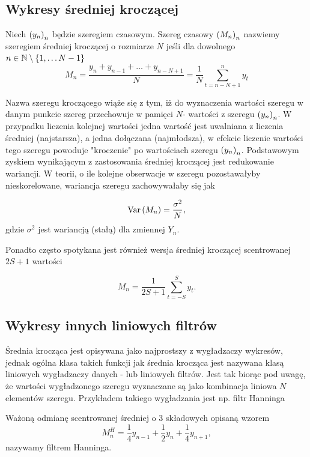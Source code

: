 \documentclass[10pt,a4paper]{book}
\begin{document}
\subsection{Wykresy średniej kroczącej}

\begin{definition}
Niech $\left( {y_n} \right)_{n}^{} $ będzie szeregiem czasowym. Szereg czasowy $\left( {M_n} \right)_{n}^{}$ nazwiemy szeregiem średniej kroczącej o rozmiarze $N$ jeśli dla dowolnego $n \in \mathbb{N} \setminus \left\lbrace {1,\ldots N-1} \right\rbrace $
$$
M_n = \frac{y_n + y_{n-1} + \ldots + y_{n-N+1}}{N} = \frac{1}{N} \sum_{t = n-N+1}^{n} y_t
$$  
\end{definition}

Nazwa szeregu kroczącego wiąże się z tym, iż do wyznaczenia wartości szeregu w danym punkcie szereg przechowuje w pamięci $N$- wartości z szeregu $\left( {y_n} \right)_{n}^{}$. W przypadku liczenia kolejnej wartości jedna wartość jest uwalniana z liczenia średniej (najstarsza), a jedna dołączana (najmłodsza), w efekcie liczenie wartości tego szeregu powoduje "kroczenie" po wartościach szeregu $\left( {y_n} \right)_{n}^{} $. Podstawowym zyskiem wynikającym z zastosowania średniej kroczącej jest redukowanie wariancji. W teorii, o ile kolejne obserwacje w szeregu pozostawałyby nieskorelowane, wariancja szeregu zachowywałaby się jak

$$
\operatorname{Var} \left( {M_n} \right) = \frac{\sigma^2}{N},
$$
gdzie $\sigma^2$ jest wariancją (stałą) dla zmiennej $Y_n$.

Ponadto często spotykana jest również wersja średniej kroczącej scentrowanej $2S +1 $  wartości

$$
M_n = \frac{1}{2S+1} \sum_{t=-S}^{S} y_t.
$$

\subsection{Wykresy innych liniowych filtrów}

Średnia krocząca jest opisywana jako najprostszy z wygładzaczy wykresów, jednak ogólna klasa takich funkcji jak średnia krocząca jest nazywana klasą liniowych wygładzaczy danych - lub liniowych filtrów. Jest tak biorąc pod uwagę, że wartości wygładzonego szeregu wyznaczane są jako kombinacja liniowa $N$ elementów szeregu. Przykładem takiego wygładzania jest np. filtr Hanninga

\begin{definition}
Ważoną odmianę scentrowanej średniej o 3 składowych opisaną wzorem
$$
M_n^H = \frac{1}{4} y_{n-1} + \frac{1}{2} y_n + \frac{1}{4} y_{n+1},
$$
nazywamy filtrem Hanninga.
\end{definition}
\end{document}
